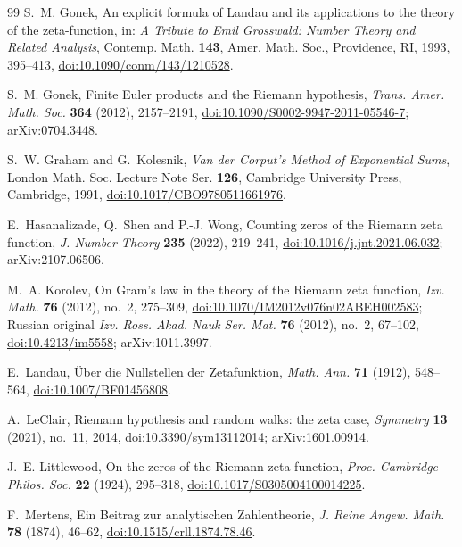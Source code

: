 \documentclass[11pt,reqno]{amsart}
\numberwithin{equation}{section}
\theoremstyle{plain}
\theoremstyle{definition}
\theoremstyle{remark}
\begin{document}
\begin{thebibliography}{99}
S.~M. Gonek, An explicit formula of Landau and its applications to the theory of the zeta-function, in: \emph{A Tribute to Emil Grosswald: Number Theory and Related Analysis}, Contemp. Math. \textbf{143}, Amer. Math. Soc., Providence, RI, 1993, 395--413, \href{https://doi.org/10.1090/conm/143/1210528}{doi:10.1090/conm/143/1210528}.

S.~M. Gonek, Finite Euler products and the Riemann hypothesis, \emph{Trans. Amer. Math. Soc.} \textbf{364} (2012), 2157--2191, \href{https://doi.org/10.1090/S0002-9947-2011-05546-7}{doi:10.1090/S0002-9947-2011-05546-7}; arXiv:0704.3448.

S.~W. Graham and G.~Kolesnik, \emph{Van der Corput's Method of Exponential Sums}, London Math. Soc. Lecture Note Ser. \textbf{126}, Cambridge University Press, Cambridge, 1991, \href{https://doi.org/10.1017/CBO9780511661976}{doi:10.1017/CBO9780511661976}.

E.~Hasanalizade, Q.~Shen and P.-J. Wong, Counting zeros of the Riemann zeta function, \emph{J. Number Theory} \textbf{235} (2022), 219--241, \href{https://doi.org/10.1016/j.jnt.2021.06.032}{doi:10.1016/j.jnt.2021.06.032}; arXiv:2107.06506.

M.~A. Korolev, On Gram's law in the theory of the Riemann zeta function, \emph{Izv. Math.} \textbf{76} (2012), no.~2, 275--309, \href{https://doi.org/10.1070/IM2012v076n02ABEH002583}{doi:10.1070/IM2012v076n02ABEH002583}; Russian original \emph{Izv. Ross. Akad. Nauk Ser. Mat.} \textbf{76} (2012), no.~2, 67--102, \href{https://doi.org/10.4213/im5558}{doi:10.4213/im5558}; arXiv:1011.3997.

E.~Landau, \"Uber die Nullstellen der Zetafunktion, \emph{Math. Ann.} \textbf{71} (1912), 548--564, \href{https://doi.org/10.1007/BF01456808}{doi:10.1007/BF01456808}.

A.~LeClair, Riemann hypothesis and random walks: the zeta case, \emph{Symmetry} \textbf{13} (2021), no.~11, 2014, \href{https://doi.org/10.3390/sym13112014}{doi:10.3390/sym13112014}; arXiv:1601.00914.

J.~E. Littlewood, On the zeros of the Riemann zeta-function, \emph{Proc. Cambridge Philos. Soc.} \textbf{22} (1924), 295--318, \href{https://doi.org/10.1017/S0305004100014225}{doi:10.1017/S0305004100014225}.

F.~Mertens, Ein Beitrag zur analytischen Zahlentheorie, \emph{J. Reine Angew. Math.} \textbf{78} (1874), 46--62, \href{https://doi.org/10.1515/crll.1874.78.46}{doi:10.1515/crll.1874.78.46}.


\end{thebibliography}
\end{document}
